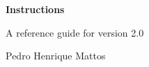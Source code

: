 \documentclass[10pt, a4paper]{article}
\begin{document}
\begin{center}
{\Huge\bfseries\normalfont Instructions}
\par
A reference guide for version 2.0
\par
Pedro Henrique Mattos
\end{center}


\tableofcontents

\clearpage




\end{document}
